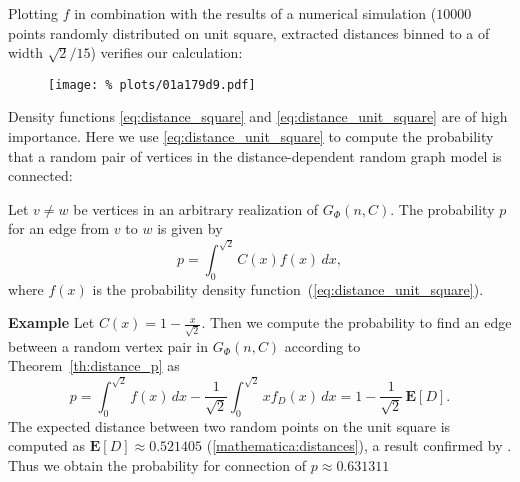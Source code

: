 Plotting $f$ in combination with the results of a numerical simulation
($10000$ points randomly distributed on unit square, extracted
distances binned to a of width $\sqrt{2}/15$) verifies our calculation: 
%
\begin{figure}[H]
  \centering
  \texttt{[image: \%
    plots/01a179d9.pdf]}%
  \label{fig:distance_distribution}
\end{figure}
%
\vspace{-0.8cm} Density functions \ref{eq:distance_square} and
\ref{eq:distance_unit_square} are of high importance. %
Here we use \ref{eq:distance_unit_square} to compute the probability
that a random pair of vertices in the distance-dependent random graph
model is connected:

\begin{corollary}\label{th:distance_p} Let $v \neq w$ be vertices in an arbitrary
  realization of $G_{\Phi}(n,C)$. The probability $p$ for an edge
  from $v$ to $w$ is given by 
  \[
    p = \int_0^{\sqrt{2}} C(x) f(x) \, dx,
  \]
  where $f(x)$ is the probability density function~(\ref{eq:distance_unit_square}).
\end{corollary}

\textbf{Example} Let $C(x) = 1 - \frac{x}{\sqrt{2}}$. Then we compute
the probability to find an edge between a random vertex pair in
$G_{\Phi}(n,C)$ according to Theorem~\ref{th:distance_p} as
\[
  p = \int_{0}^{\sqrt{2}} f(x) \, dx - \frac{1}{\sqrt{2}}
  \int_0^{\sqrt{2}} x f_D(x) \, dx = 1 - \frac{1}{\sqrt{2}}\, \mathbf{E}[D].
\]
The expected distance between two random points on the unit square is
computed as $\mathbf{E}[D] \approx 0.521405$ (\autoref{mathematica:distances}),
a result confirmed by \textcite{Philip2007}. Thus we obtain the
probability for connection of $p \approx 0.631311$


